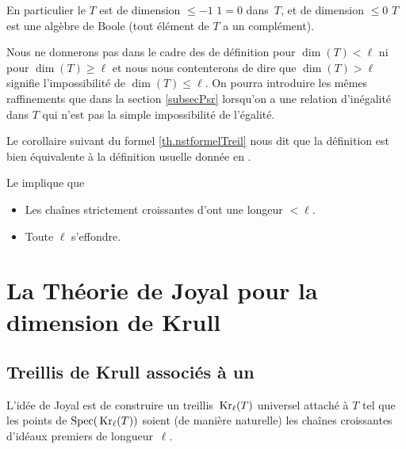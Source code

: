 En particulier le \trdi $T$ est de dimension $\leq -1$ \ssi $1=0$
dans~$T$, et  de dimension
$\leq 0$ \ssi $T$ est une algèbre de Boole (tout élément de
$T$ a un complément).

Nous ne donnerons pas dans le cadre des \trdis de définition pour
$\dim(T)<\ell$ ni pour $\dim(T)\geq \ell$ et nous nous contenterons de 
dire
que $\dim(T)>\ell$ signifie l'impossibilité de $\dim(T)\leq \ell$.
On pourra introduire les mêmes raffinements
que dans la section \ref{subsecPsr}
lorsqu'on a une relation d'inégalité dans $T$ qui n'est pas la simple
impossibilité de l'égalité.

\smallskip Le corollaire suivant du \nst formel \ref{th.nstformelTreil} nous dit que la définition \cov est bien équivalente à la définition usuelle donnée en \clama.

\begin{theorem}
\label{th.defdimTr} Le \tcg implique que \propeq
\begin{itemize}
\item [$(a)$] Les chaînes strictement croissantes d'\ideps ont une longeur $< \ell$.
\item [$(b)$] Toute \proelo $\ell$ s'effondre.
\end{itemize}
\end{theorem}






\section{La Théorie de Joyal pour la dimension de Krull}
\label{secJoyal}

\subsection{Treillis de Krull associés à un \trdi}
\label{subsecJoyalKrull}


L'idée de Joyal est de construire un treillis $\,{\rm Kr}_\ell(T)$ universel
attaché à $T$  tel que les points de ${\rm Spec}(\,{\rm Kr}_\ell(T))$  soient
(de manière naturelle) les chaînes croissantes d'idéaux premiers 
de longueur~$\ell$.

